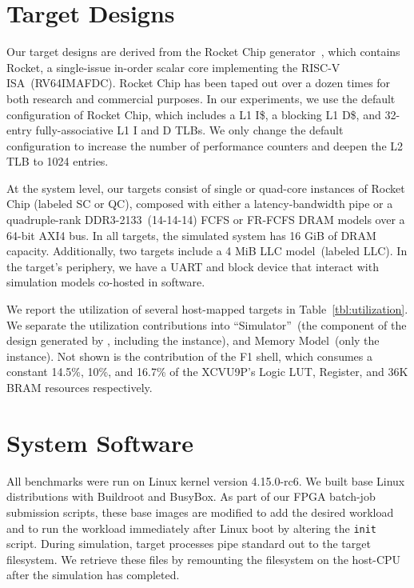 \section{Target Designs}\label{sec:target-parameters} Our target designs
are derived from the Rocket Chip generator~\cite{rocketchip}, which contains
Rocket, a single-issue in-order scalar core implementing the RISC-V
ISA~(RV64IMAFDC). Rocket Chip
has been taped out over a dozen times for both research and commercial
purposes. In our
experiments, we use the default
configuration of Rocket Chip, which includes
a  L1 I\$, a blocking  L1 D\$, and 32-entry
fully-associative L1 I and D TLBs. We only change the default configuration to
increase the number of performance counters and deepen the L2 TLB to 1024 entries.

At the system level, our targets consist of single or quad-core instances
of Rocket Chip (labeled SC or QC), composed with either a latency-bandwidth pipe
or a quadruple-rank DDR3-2133~(14-14-14) FCFS or FR-FCFS
DRAM models over a 64-bit AXI4 bus. In all targets, the simulated system has
16 GiB of DRAM capacity. Additionally, two targets include a 4 MiB
LLC model~(labeled LLC). In the target's periphery, we have a UART and block
device that interact with simulation models co-hosted in software.

We report the utilization of several host-mapped targets in
Table~\ref{tbl:utilization}.  We separate the utilization contributions into ``Simulator''~(the
component of the design generated by \SIMNAME, including the \PNAME instance),
and Memory Model~(only the \PNAME instance). Not shown is the contribution of the
F1 shell, which consumes a constant 14.5\%, 10\%, and 16.7\%  of the XCVU9P's
Logic LUT, Register, and 36K BRAM resources respectively.

\section{System Software}

All benchmarks were run on Linux kernel version 4.15.0-rc6. We built base Linux
distributions with Buildroot and BusyBox. As part of our FPGA batch-job submission
scripts, these base images are modified to add the desired workload and to run
the workload immediately after Linux boot by altering the \texttt{init}
script. During simulation, target processes pipe standard out to the target
filesystem. We retrieve these files by remounting the filesystem on the
host-CPU after the simulation has completed.

